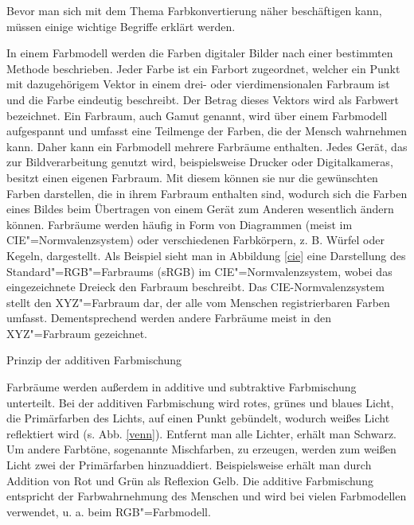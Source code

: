 \documentclass[a4paper,12pt,abstracton,titlepage]{scrartcl}
\begin{document}
Bevor man sich mit dem Thema Farbkonvertierung näher beschäftigen kann, müssen einige wichtige Begriffe erklärt werden.

In einem Farbmodell werden die Farben digitaler Bilder nach einer bestimmten Methode beschrieben. Jeder Farbe ist ein Farbort zugeordnet, welcher ein Punkt mit dazugehörigem Vektor in einem drei- oder vierdimensionalen Farbraum ist und die Farbe eindeutig beschreibt. Der Betrag dieses Vektors wird als Farbwert bezeichnet.
Ein Farbraum, auch Gamut genannt, wird über einem Farbmodell aufgespannt und umfasst eine Teilmenge der Farben, die der Mensch wahrnehmen kann. Daher kann ein Farbmodell mehrere Farbräume enthalten. Jedes Gerät, das zur Bildverarbeitung genutzt wird, beispielsweise Drucker oder Digitalkameras, besitzt einen eigenen Farbraum. Mit diesem können sie nur die gewünschten Farben darstellen, die in ihrem Farbraum enthalten sind, wodurch sich die Farben eines Bildes beim Übertragen von einem Gerät zum Anderen wesentlich ändern können. Farbräume werden häufig in Form von Diagrammen (meist im CIE"=Normvalenzsystem) oder verschiedenen Farbkörpern, z. B. Würfel oder Kegeln, dargestellt. Als Beispiel sieht man in Abbildung \ref{cie} eine Darstellung des Standard"=RGB"=Farbraums (sRGB) im CIE"=Normvalenzsystem, wobei das eingezeichnete Dreieck den Farbraum beschreibt. Das CIE-Normvalenzsystem stellt den XYZ"=Farbraum dar, der alle vom Menschen registrierbaren Farben umfasst. Dementsprechend werden andere Farbräume meist in den XYZ"=Farbraum gezeichnet.


\begin{floatingfigure}[l]{5.3cm}
	\caption{Prinzip der additiven Farbmischung}
	\label{venn}
\end{floatingfigure}

\par

Farbräume werden außerdem in additive und subtraktive Farbmischung unterteilt.
Bei der additiven Farbmischung wird rotes, grünes und blaues Licht, die Primärfarben des Lichts, auf einen Punkt gebündelt, wodurch weißes Licht reflektiert wird (s. Abb. \ref{venn}). Entfernt man alle Lichter, erhält man Schwarz.  Um andere Farbtöne, sogenannte Mischfarben, zu erzeugen, werden zum weißen Licht zwei der Primärfarben hinzuaddiert. Beispielsweise erhält man durch Addition von Rot und Grün als Reflexion Gelb. Die additive Farbmischung entspricht der Farbwahrnehmung des Menschen und wird bei vielen Farbmodellen verwendet, u. a. beim RGB"=Farbmodell.
\end{document}
